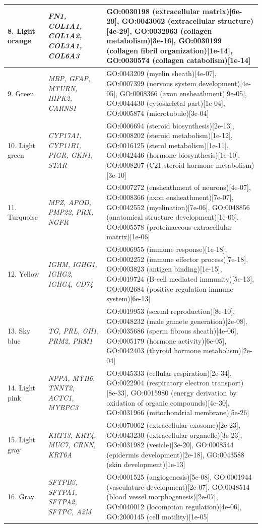 \documentclass[10pt,letterpaper]{article}
\begin{document}
\begin{table}[!hp]
\begin{adjustwidth}{-2in}{0in}
\begin{tabular}{|p{1.0in}|p{1.5in}|p{4.3in}|}
8. Light orange & \textit{FN1, COL1A1, COL1A2, COL3A1, COL6A3} & GO:0030198 (extracellular matrix)[6e-29], GO:0043062 (extracellular structure)[4e-29], GO:0032963 (collagen metabolism)[3e-16], GO:0030199 (collagen fibril organization)[1e-14], GO:0030574 (collagen catabolism)[1e-14] \\ \hline
9. Green & \textit{MBP, GFAP, MTURN, HIPK2, CARNS1} & GO:0043209 (myelin sheath)[4e-07], GO:0007399 (nervous system development)[4e-05], GO:0008366 (axon ensheathment)[9e-05], GO:0044430 (cytoskeletal part)[1e-04], GO:0005874 (microtubule)[3e-04] \\ \hline
10. Light green & \textit{CYP17A1, CYP11B1, PIGR, GKN1, STAR} & GO:0006694 (steroid biosynthesis)[2e-13], GO:0008202 (steroid metabolism)[1e-12], GO:0016125 (sterol metabolism)[1e-11], GO:0042446 (hormone biosynthesis)[1e-10], GO:0008207 (C21-steroid hormone metabolism)[3e-10] \\ \hline
11. Turquoise & \textit{MPZ, APOD, PMP22, PRX, NGFR} & GO:0007272 (ensheathment of neurons)[4e-07], GO:0008366 (axon ensheathment)[7e-07], GO:0042552 (myelination)[7e-06], GO:0048856 (anatomical structure development)[1e-06], GO:0005578 (proteinaceous extracellular matrix)[1e-06] \\ \hline
12. Yellow & \textit{IGHM, IGHG1, IGHG2, IGHG4, CD74} & GO:0006955 (immune response)[1e-18], GO:0002252 (immune effector process)[7e-18], GO:0003823 (antigen binding)[1e-15], GO:0019724 (B-cell mediated immunity)[5e-13], GO:0002684 (positive regulation immune system)[6e-13] \\ \hline
13. Sky blue & \textit{TG, PRL, GH1, PRM2, PRM1} & GO:0019953 (sexual reproduction)[8e-10], GO:0048232 (male gamete generation)[2e-08], GO:0035686 (sperm fibrous sheath)[4e-06], GO:0005179 (hormone activity)[6e-05], GO:0042403 (thyroid hormone metabolism)[2e-04] \\ \hline
14. Light pink & \textit{NPPA, MYH6, TNNT2, ACTC1, MYBPC3} & GO:0045333 (cellular respiration)[2e-34], GO:0022904 (respiratory electron transport)[8e-33], GO:0015980 (energy derivation by oxidation of organic compounds)[4e-30], GO:0031966 (mitochondrial membrane)[5e-26] \\ \hline
15. Light gray & \textit{KRT13, KRT4, MUC7, CRNN, KRT6A} & GO:0070062 (extracellular exosome)[2e-23], GO:0043230 (extracellular organelle)[3e-23], GO:0031982 (vesicle)[3e-20], GO:0008544 (epidermis development)[2e-18], GO:0043588 (skin development)[1e-13] \\ \hline
16. Gray & \textit{SFTPB$\beta$, SFTPA1, SFTPA2, SFTPC, A2M} & GO:0001525 (angiogenesis)[5e-08], GO:0001944 (vasculature development)[2e-07], GO:0048514 (blood vessel morphogenesis)[2e-07], GO:0040012 (locomotion regulation)[4e-06], GO:2000145 (cell motility)[1e-05] \\ \hline

\end{tabular}
\end{adjustwidth}
\end{table}
\end{document}
